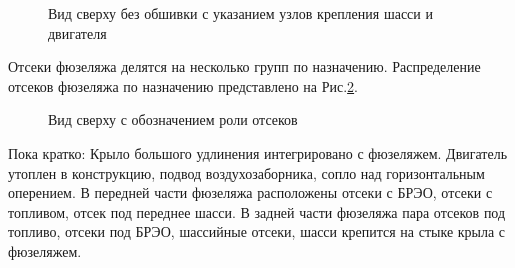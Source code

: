\begin{figure}[H]
\centering
\def\svgwidth{0.9\textwidth}

\caption{Вид сверху без обшивки с указанием узлов крепления шасси и двигателя}
\label{fig:BPS_Catia_Top_WithoutSkin}
\end{figure}

Отсеки фюзеляжа делятся на несколько групп по назначению. Распределение отсеков фюзеляжа по назначению представлено на Рис.\ref{fig:BPS_Catia_Top_PartRoles}. 


\begin{figure}[H]
\centering
\def\svgwidth{0.9\textwidth}

\caption{Вид сверху с обозначением роли отсеков}
\label{fig:BPS_Catia_Top_PartRoles}
\end{figure}




Пока кратко: Крыло большого удлинения интегрировано с фюзеляжем. Двигатель утоплен в конструкцию, подвод воздухозаборника, сопло над горизонтальным оперением. В передней части фюзеляжа расположены отсеки с БРЭО, отсеки с топливом, отсек под переднее шасси. 
В задней части фюзеляжа пара отсеков под топливо, отсеки под БРЭО, шассийные отсеки, шасси крепится на стыке крыла с фюзеляжем. 







